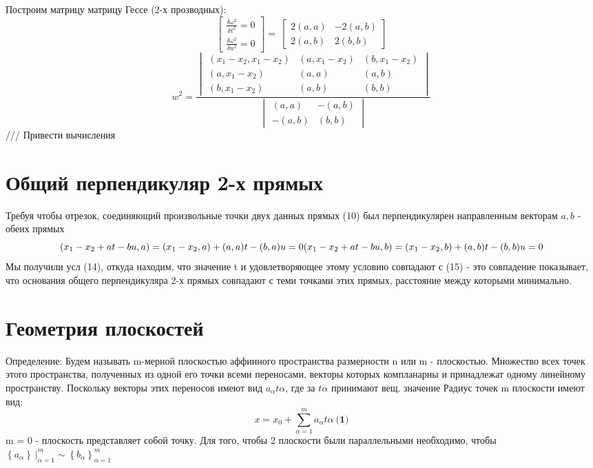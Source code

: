 \documentclass{article}
\begin{document}
Построим матрицу матрицу Гессе (2-х прозводных):
\[\begin{bmatrix}\frac{\delta \omega ^2}{\delta t^2} = 0 
\\ 
\frac{\delta \omega ^2}{\delta u^2} = 0 
\end{bmatrix} = 
\ \begin{bmatrix}
2(a,a) & -2(a,b) \\ 
2(a,b) & 2(b,b)
\end{bmatrix}\]
\[w^2 = \frac{\begin{vmatrix}
(x_1-x_2,x_1-x_2) & (a, x_1-x_2) & (b,x_1-x_2)\\ 
(a, x_1-x_2)  & (a,a) & (a,b)\\ 
(b,x_1-x_2) & (a,b) & (b,b)
\end{vmatrix}}{\begin{vmatrix}
(a,a) & -(a,b) \\ 
-(a,b) & (b,b)
\end{vmatrix}}\]
/// Привести вычисления
\section{Общий перпендикуляр 2-х прямых}
Требуя чтобы отрезок, соединяющий произвольные точки двух данных прямых (10) был перпендикулярен направленным векторам \(a, b\) - обеих прямых
\[(x_1-x_2+at-bu, a) = (x_1-x_2,a) + (a,a)t - (b,a)u = 0
\newline
(x_1-x_2+at-bu, b) = (x_1-x_2,b) + (a,b)t - (b,b)u = 0\]
Мы получили усл (14), откуда находим, что значение t и удовлетворяющее этому условию совпадают с (15) - это совпадение показывает, что основания общего перпендикуляра 2-х прямых совпадают с теми точками этих прямых, расстояние между которыми минимально. 
\section{Геометрия плоскостей}
Определение:\newline
Будем называть m-мерной плоскостью аффинного пространства размерности n или m - плоскостью. Множество всех точек этого пространства, полученных из одной его точки всеми переносами, векторы которых компланарны и принадлежат одному линейному пространству. \newline
Поскольку векторы этих переносов имеют вид \(a_\alpha t\alpha\), где за \(t\alpha\) принимают вещ. значение\newline
Радиус точек m плоскости имеют вид:\newline
\[x = x_0 + \sum_{\alpha = 1}^{m}a_\alpha t\alpha\ \textbf{(1)}\]
m = 0 - плоскость представляет собой точку. 
\newline
Для того, чтобы 2 плоскости были параллельными необходимо, чтобы \(\left \{ a_{\alpha} \right \}\ |_{\alpha = 1}^{m} \sim \left \{ b_{\alpha} \right \}_{\alpha = 1}^{m}\)
\end{document}
